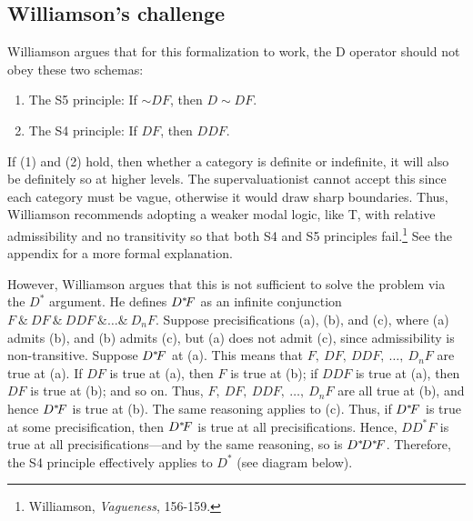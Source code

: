 \subsection{Williamson's challenge}

Williamson argues that for this formalization to work, the D operator
should not obey these two schemas:
\begin{enumerate}
\def\labelenumi{(\arabic{enumi})}
\item{The S5 principle: If ${\sim}DF$, then $D{\sim}DF$.}
\item{The S4 principle: If $DF$, then $DDF$.}
\end{enumerate}

If (1) and (2) hold, then whether a category is definite or indefinite,
it will also be definitely so at higher levels. The supervaluationist
cannot accept this since each category must be vague, otherwise it would
draw sharp boundaries. Thus, Williamson recommends adopting a weaker
modal logic, like T, with relative admissibility and no transitivity so
that both S4 and S5 principles fail.\footnote{Williamson,
  \emph{Vagueness}, 156-159.} See the appendix for a more formal
explanation.

However, Williamson argues that this is not sufficient to solve the
problem via the $D^*$ argument. He defines $D^*\hspace{-0.2em}F$ as an infinite
conjunction $F \ \&  \ DF \ \& \ DDF \ \& \ldots \& \ D_{n}F$. Suppose
precisifications (a), (b), and (c), where (a) admits (b), and (b) admits
(c), but (a) does not admit (c), since admissibility is non-transitive.
Suppose $D^*\hspace{-0.2em}F$ at (a). This means that
$F, \ DF, \ DDF, \ \ldots, \ D_{n}F$ are true at (a). If $DF$ is true at
(a), then $F$ is true at (b); if $DDF$ is true at (a), then $DF$
is true at (b); and so on. Thus, $F, \ DF, \ DDF, \ \ldots, \ D_{n}F$ are
all true at (b), and hence $D^*\hspace{-0.2em}F$ is true at (b). The same reasoning
applies to (c). Thus, if $D^*\hspace{-0.2em}F$ is true at some precisification,
then $D^*\hspace{-0.2em}F$ is true at all precisifications. Hence, ${DD}^{*}F$ is
true at all precisifications---and by the same reasoning, so is
$D^*\hspace{-0.2em}D^*\hspace{-0.2em}F$. Therefore, the S4 principle effectively applies to
$D^*$ (see diagram below).


